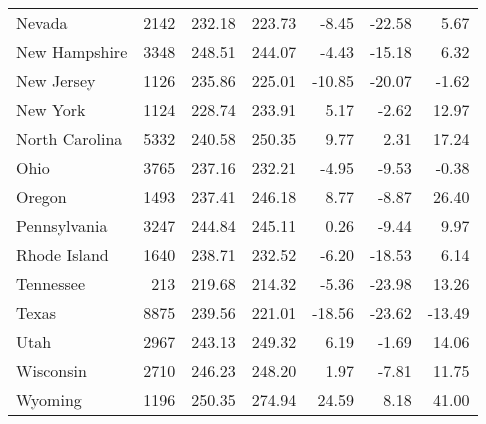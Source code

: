 \begin{table}[ht]
\begin{center}
\begin{tabular}{lrrrrrr}
  Nevada & 2142 & 232.18 & 223.73 & -8.45 & -22.58 & 5.67 \\ 
  New Hampshire & 3348 & 248.51 & 244.07 & -4.43 & -15.18 & 6.32 \\ 
  New Jersey & 1126 & 235.86 & 225.01 & -10.85 & -20.07 & -1.62 \\ 
  New York & 1124 & 228.74 & 233.91 & 5.17 & -2.62 & 12.97 \\ 
  North Carolina & 5332 & 240.58 & 250.35 & 9.77 & 2.31 & 17.24 \\ 
  Ohio & 3765 & 237.16 & 232.21 & -4.95 & -9.53 & -0.38 \\ 
  Oregon & 1493 & 237.41 & 246.18 & 8.77 & -8.87 & 26.40 \\ 
  Pennsylvania & 3247 & 244.84 & 245.11 & 0.26 & -9.44 & 9.97 \\ 
  Rhode Island & 1640 & 238.71 & 232.52 & -6.20 & -18.53 & 6.14 \\ 
  Tennessee & 213 & 219.68 & 214.32 & -5.36 & -23.98 & 13.26 \\ 
  Texas & 8875 & 239.56 & 221.01 & -18.56 & -23.62 & -13.49 \\ 
  Utah & 2967 & 243.13 & 249.32 & 6.19 & -1.69 & 14.06 \\ 
  Wisconsin & 2710 & 246.23 & 248.20 & 1.97 & -7.81 & 11.75 \\ 
  Wyoming & 1196 & 250.35 & 274.94 & 24.59 & 8.18 & 41.00 \\ 
   \hline
\end{tabular}
\end{center}
\end{table}

